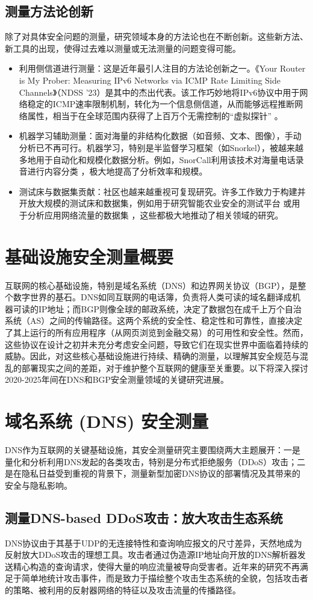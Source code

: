 \documentclass[conference]{IEEEtran}
\begin{document}
\subsection{测量方法论创新}
除了对具体安全问题的测量，研究领域本身的方法论也在不断创新。这些新方法、新工具的出现，使得过去难以测量或无法测量的问题变得可能。
\begin{itemize}
\item 利用侧信道进行测量：这是近年最引人注目的方法论创新之一。《Your Router is My Prober: Measuring IPv6 Networks via ICMP Rate Limiting Side Channels》（NDSS '23）是其中的杰出代表。该工作巧妙地将IPv6协议中用于网络稳定的ICMP速率限制机制，转化为一个信息侧信道，从而能够远程推断网络属性，相当于在全球范围内获得了上百万个无需控制的“虚拟探针” 。
\item 机器学习辅助测量：面对海量的非结构化数据（如音频、文本、图像），手动分析已不再可行。机器学习，特别是半监督学习框架（如Snorkel），被越来越多地用于自动化和规模化数据分析。例如，SnorCall利用该技术对海量电话录音进行内容分类 ，极大地提高了分析效率和规模。
\item 测试床与数据集贡献：社区也越来越重视可复现研究。许多工作致力于构建并开放大规模的测试床和数据集，例如用于研究智能农业安全的测试平台  或用于分析应用网络流量的数据集 ，这些都极大地推动了相关领域的研究。
\end{itemize}
\section{基础设施安全测量概要}
互联网的核心基础设施，特别是域名系统（DNS）和边界网关协议（BGP），是整个数字世界的基石。DNS如同互联网的电话簿，负责将人类可读的域名翻译成机器可读的IP地址；而BGP则像全球的邮政系统，决定了数据包在成千上万个自治系统（AS）之间的传输路径。这两个系统的安全性、稳定性和可靠性，直接决定了其上运行的所有应用程序（从网页浏览到金融交易）的可用性和安全性。然而，这些协议在设计之初并未充分考虑安全问题，导致它们在现实世界中面临着持续的威胁。因此，对这些核心基础设施进行持续、精确的测量，以理解其安全规范与混乱的部署现实之间的差距，对于维护整个互联网的健康至关重要。以下将深入探讨2020-2025年间在DNS和BGP安全测量领域的关键研究进展。
\section{域名系统 (DNS) 安全测量}
DNS作为互联网的关键基础设施，其安全测量研究主要围绕两大主题展开：一是量化和分析利用DNS发起的各类攻击，特别是分布式拒绝服务（DDoS）攻击；二是在隐私日益受到重视的背景下，测量新型加密DNS协议的部署情况及其带来的安全与隐私影响。
\subsection{测量DNS-based DDoS攻击：放大攻击生态系统}
DNS协议由于其基于UDP的无连接特性和查询响应报文的尺寸差异，天然地成为反射放大DDoS攻击的理想工具。攻击者通过伪造源IP地址向开放的DNS解析器发送精心构造的查询请求，使得大量的响应流量被导向受害者。近年来的研究不再满足于简单地统计攻击事件，而是致力于描绘整个攻击生态系统的全貌，包括攻击者的策略、被利用的反射器网络的特征以及攻击流量的传播路径。
\end{document}
